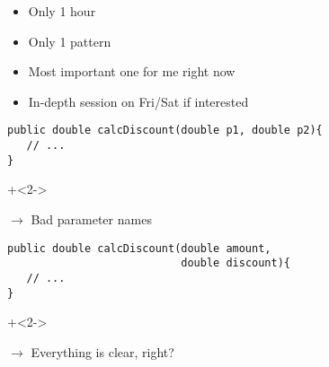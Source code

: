 \begin{frame}[fragile]{}

\begin{itemize}
\item Only 1 hour
\item Only 1 pattern
\vspace{1em}
\item Most important one for me right now
\item In-depth session on Fri/Sat if interested 
\end{itemize}

\end{frame}



\begin{frame}[fragile]{}

\begin{lstlisting}
public double calcDiscount(double p1, double p2){
   // ...
}
\end{lstlisting}

\onslide+<2->

\vspace{2em}

$\longrightarrow$ Bad parameter names

\end{frame}

\begin{frame}[fragile]{}

\begin{lstlisting}
public double calcDiscount(double amount, 
                           double discount){
   // ...
}
\end{lstlisting}

\onslide+<2->

\vspace{2em}

$\longrightarrow$ Everything is clear, right?

\end{frame}


